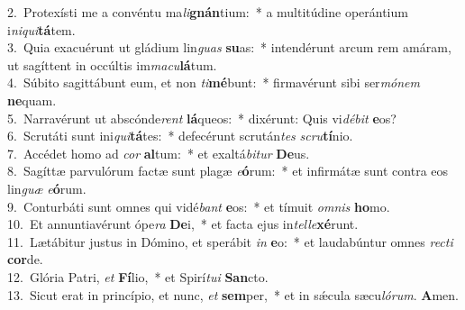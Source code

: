 {2.~}Protexísti me a convéntu ma\textit{li}\textbf{gnán}tium:~* a multitúdine operántium i\textit{ni}\textit{qui}\textbf{tá}tem.\\
{3.~}Quia exacuérunt ut gládium lin\textit{guas} \textbf{su}as:~* intendérunt arcum rem amáram, ut sagíttent in occúltis im\textit{ma}\textit{cu}\textbf{lá}tum.\\
{4.~}Súbito sagittábunt eum, et non \textit{ti}\textbf{mé}bunt:~* firmavérunt sibi ser\textit{mó}\textit{nem} \textbf{ne}quam.\\
{5.~}Narravérunt ut abscónde\textit{rent} \textbf{lá}queos:~* dixérunt: Quis vi\textit{dé}\textit{bit} \textbf{e}os?\\
{6.~}Scrutáti sunt ini\textit{qui}\textbf{tá}tes:~* defecérunt scrután\textit{tes} \textit{scru}\textbf{tí}nio.\\
{7.~}Accédet homo ad \textit{cor} \textbf{al}tum:~* et exaltá\textit{bi}\textit{tur} \textbf{De}us.\\
{8.~}Sagíttæ parvulórum factæ sunt plagæ \textit{e}\textbf{ó}rum:~* et infirmátæ sunt contra eos lin\textit{guæ} \textit{e}\textbf{ó}rum.\\
{9.~}Conturbáti sunt omnes qui vidé\textit{bant} \textbf{e}os:~* et tímuit \textit{om}\textit{nis} \textbf{ho}mo.\\
{10.~}Et annuntiavérunt ópe\textit{ra} \textbf{De}i,~* et facta ejus in\textit{tel}\textit{le}\textbf{xé}runt.\\
{11.~}Lætábitur justus in Dómino, et sperábit \textit{in} \textbf{e}o:~* et laudabúntur omnes \textit{re}\textit{cti} \textbf{cor}de.\\
{12.~}Glória Patri, \textit{et} \textbf{Fí}lio,~* et Spirí\textit{tu}\textit{i} \textbf{San}cto.\\
{13.~}Sicut erat in princípio, et nunc, \textit{et} \textbf{sem}per,~* et in sǽcula sæcu\textit{ló}\textit{rum}. \textbf{A}men.\\
